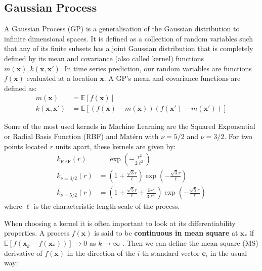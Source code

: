 \documentclass[pdftex,10pt,a4paper,journal]{article}
\theoremstyle{definition}
\theoremstyle{remark}
\newcommand*{\V}[1]{\mathbf{#1}}%
\begin{document}
\begin{multicols}{2}

\subsection{Gaussian Process}
A Gaussian Process (GP) is a generalisation of the Gaussian distribution to infinite dimensional spaces.  It is defined as a collection of random variables such that any of its finite subsets has a joint Gaussian distribution that is completely defined by its mean and covariance (also called kernel) functions $m(\V{x}), k(\V{x}, \V{x}')$. In time series prediction, our random variables are functions $f(\V{x})$ evaluated at a location $\V{x}$. A GP's mean and covariance functions are defined as:
\begin{align*}
    m(\V{x}) &= \mathbb{E}[f(\V{x})]\\
    k(\V{x}, \V{x}') &= \mathbb{E}[(f(\V{x}) - m(\V{x}))(f(\V{x}') - m(\V{x}'))]
\end{align*}

\par Some of the most used kernels in Machine Learning \cite{Rasmussen2006} are the Squared Exponential or Radial Basis Function (RBF) and Mat\'ern with $\nu = 5/2$ and $\nu = 3/2$. For two points located $r$ units apart, these kernels are given by:
\begin{align*}
    k_{\text{RBF}}(r) &= \exp{\left(-\frac{r^2}{2\ell^2}\right)}\\
    k_{\nu = 3/2}(r) &= \left( 1 + \frac{\sqrt{3}r}{\ell}\right) \exp{\left(-\frac{\sqrt{3}r}{\ell}\right)} \\ 
    k_{\nu = 5/2}(r) &= \left( 1 + \frac{\sqrt{5}r}{\ell} + \frac{5r^2}{3\ell^2}\right) \exp{\left(-\frac{\sqrt{5}r}{\ell}\right)} 
\end{align*}
where $\ell$ is the characteristic length-scale of the process. 

\par When choosing a kernel it is often important to look at its differentiability properties. A process $f(\V{x})$ is said to be \textbf{continuous in mean square} at $\V{x}_*$ if $\mathbb{E}[f(\V{x}_k - f(\V{x}_*))] \rightarrow 0$ as $k \rightarrow \infty$ \cite{Rasmussen2006}. Then we can define the mean square (MS) derivative of $f(\V{x})$ in the direction of the $i$-th standard vector $\V{e}_i$ in the usual way:


\end{multicols}
\end{document}
